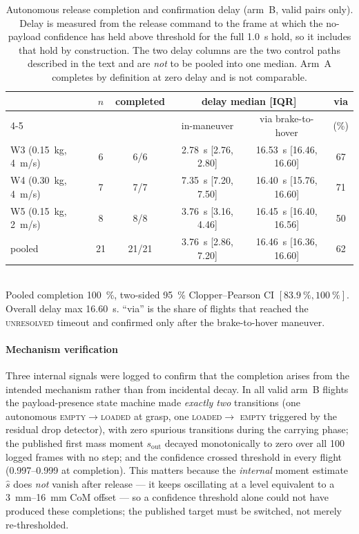 \begin{table}[t]
\caption{Autonomous release completion and confirmation delay (arm~B, valid pairs only).
Delay is measured from the release command to the frame at which the no-payload confidence
has held above threshold for the full \SI{1.0}{s} hold, so it includes that hold by
construction. The two delay columns are the two control paths described in the text and are
\emph{not} to be pooled into one median. Arm~A completes by definition at zero delay and is
not comparable.}
\label{tab:complete}
\centering
\begin{tabular}{@{}lccccc@{}}
\toprule
 & $n$ & completed & \multicolumn{2}{c}{delay median [IQR]} & via \\
\cmidrule(lr){4-5}
 & & & in-maneuver & via brake-to-hover & (\%) \\
\midrule
W3 (\SI{0.15}{kg}, \SI{4}{m/s}) & 6 & 6/6 & \SI{2.78}{s} [2.76, 2.80] & \SI{16.53}{s} [16.46, 16.60] & 67 \\
W4 (\SI{0.30}{kg}, \SI{4}{m/s}) & 7 & 7/7 & \SI{7.35}{s} [7.20, 7.50] & \SI{16.40}{s} [15.76, 16.60] & 71 \\
W5 (\SI{0.15}{kg}, \SI{2}{m/s}) & 8 & 8/8 & \SI{3.76}{s} [3.16, 4.46] & \SI{16.45}{s} [16.40, 16.56] & 50 \\
\midrule
pooled & 21 & 21/21 & \SI{3.76}{s} [2.86, 7.20] & \SI{16.46}{s} [16.36, 16.60] & 62 \\
\bottomrule
\end{tabular}
\\[2pt]
\footnotesize Pooled completion \SI{100}{\percent}, two-sided \SI{95}{\percent}
Clopper--Pearson CI $[\SI{83.9}{\percent}, \SI{100}{\percent}]$. Overall delay max
\SI{16.60}{s}. ``via'' is the share of flights that reached the \textsc{unresolved} timeout
and confirmed only after the brake-to-hover maneuver.
\end{table}

\paragraph{Mechanism verification} Three internal signals were logged to confirm that the
completion arises from the intended mechanism rather than from incidental decay. In all valid arm~B flights the payload-presence state machine made \emph{exactly two} transitions
(one autonomous \textsc{empty}$\to$\textsc{loaded} at grasp, one \textsc{loaded}$\to$
\textsc{empty} triggered by the residual drop detector), with zero spurious transitions
during the carrying phase; the published first mass moment $s_{\text{out}}$ decayed
monotonically to zero over all 100 logged frames with no step; and the confidence crossed
threshold in every flight (\numrange{0.997}{0.999} at completion). This matters because the
\emph{internal} moment estimate $\hat s$ does \emph{not} vanish after release --- it keeps
oscillating at a level equivalent to a \SIrange{3}{16}{mm} CoM offset --- so a confidence
threshold alone could not have produced these completions; the published target must be
switched, not merely re-thresholded.

